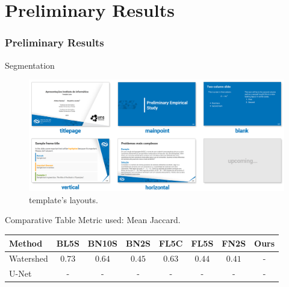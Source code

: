 \section{Preliminary Results}


\begin{frame}{}
    \frametitle{Preliminary Results}
\end{frame}


\begin{frame}{Segmentation}
    \begin{figure}
        \centering
        \includegraphics[width=.9\textwidth]{readme/layouts.png}
        \caption{template's layouts.}
        \label{fig:results}
    \end{figure}
\end{frame}

\begin{frame}{Comparative Table}
    Metric used: \alert{Mean Jaccard}.
    \begin{table}[]
        \centering
        \setlength{\tabcolsep}{10pt}
        
        {
            \begin{tabular}{lccccccc}
                Method & BL5S & BN10S & BN2S & FL5C & FL5S & FN2S & Ours \\
                \midrule
                Watershed & $0.73$ & $0.64$ & $0.45$ &  $0.63$ & $0.44$ & $0.41$ & - \\
                U-Net & - & - & - & - & - & - & -
            \end{tabular}
        }
    \end{table}
\end{frame}
